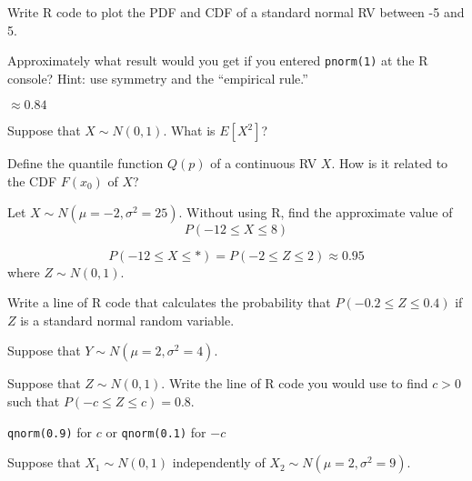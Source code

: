 \documentclass[addpoints,12pt]{exam}
\begin{document}
\begin{questions}
\question Write R code to plot the PDF and CDF of a standard normal RV between -5 and 5.

\question Approximately what result would you get if you entered \texttt{pnorm(1)} at the R console? Hint: use symmetry and the ``empirical rule.''
\begin{solution}
  $\approx 0.84$
\end{solution}

\question Suppose that $X \sim N(0,1)$. What is $E[X^2]$?

\question Define the quantile function $Q(p)$ of a continuous RV $X$. How is it related to the CDF $F(x_0)$ of $X$?

\question Let $X \sim N(\mu = -2, \sigma^2 = 25)$. 
Without using R, find the approximate value of
\[P(-12 \leq X \leq 8)\] 
\begin{solution}
\[
  P(-12 \leq X \leq *) = P(-2 \leq Z \leq 2) \approx 0.95
\]
where $Z \sim N(0,1)$.
\end{solution}

\question Write a line of R code that calculates the probability that $P(-0.2 \leq Z \leq 0.4)$ if $Z$ is a standard normal random variable.

\question Suppose that $Y \sim N(\mu = 2, \sigma^2 = 4)$. 

\question Suppose that $Z \sim N(0,1)$. Write the line of R code you would use to find $c>0$ such that $P(-c \leq Z \leq c) = 0.8$.
\begin{solution}
  \texttt{qnorm(0.9)} for $c$ or \texttt{qnorm(0.1)} for $-c$
\end{solution}


\question Suppose that $X_1 \sim N(0,1)$ independently of $X_2 \sim N(\mu = 2, \sigma^2 = 9)$.
\end{questions}
\end{document}
